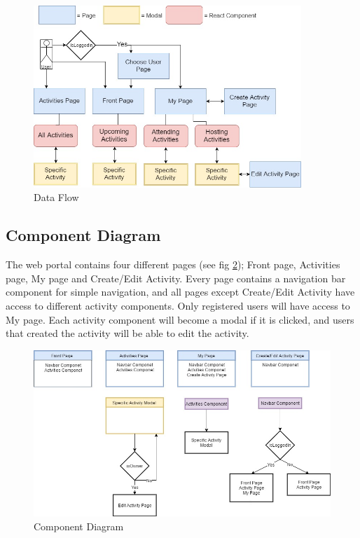 \begin{figure}[H]
\centering
    \includegraphics[width=0.9\textwidth]{fig/dataFlow}
\caption{Data Flow}
\label{Data_Flow_Diagram}
\end{figure}

\subsection{Component Diagram}
The web portal contains four different pages (see fig \ref{Component_Diagram}); Front page, Activities page, My page and Create/Edit Activity. Every page contains a navigation bar component for simple navigation, and all pages except Create/Edit Activity have access to different activity components. Only registered users will have access to My page. Each activity component will become a modal if it is clicked, and users that created the activity will be able to edit the activity.

\begin{figure}[H]
\centering
    \includegraphics[width=1.0\textwidth]{fig/Component_diagram}
\caption{Component Diagram}
\label{Component_Diagram}
\end{figure}




